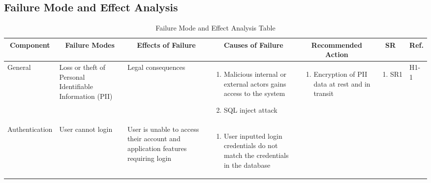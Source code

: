\documentclass{article}
\begin{document}
\newpage
\begin{landscape}
	\section{Failure Mode and Effect Analysis}
	\begin{longtable}{|p{}|p{}|p{}|p{}|p{}|p{}|p{}|}
		\caption{Failure Mode and Effect Analysis Table}                                                                \\
		\hline
		\multicolumn{1}{|c|}{\textbf{Component}}
		 & \multicolumn{1}{|c|}{\textbf{Failure Modes}}
		 & \multicolumn{1}{|c|}{\textbf{Effects of Failure}}
		 & \multicolumn{1}{|c|}{\textbf{Causes of Failure}}
		 & \multicolumn{1}{|c|}{\textbf{Recommended Action}}
		 & \multicolumn{1}{|c|}{\textbf{SR}}
		 & \multicolumn{1}{|c|}{\textbf{Ref.}}                                                                          \\
		\hline
		General
		 & Loss or theft of Personal Identifiable Information (PII)
		 & Legal consequences
		 & \begin{enumerate}[label=\alph*., leftmargin=*]
			   \item Malicious internal or external actors gains access to the system
			   \item SQL inject attack
		   \end{enumerate}
		 & \begin{enumerate}[label=\alph*., leftmargin=*]
			   \item Encryption of PII data at rest and in transit
		   \end{enumerate}
		 & \begin{enumerate}[label=\alph*., leftmargin=*]
			   \item SR1
		   \end{enumerate}
		 & H1-1                                                                                                         \\
		\hline
		\multirow{2}{*}{Authentication}
		 & User cannot login
		 & User is unable to access their account and application features requiring login
		 & \begin{enumerate}[label=\alph*., leftmargin=*]
			   \item User inputted login credentials do not match the credentials in the database
		   \end{enumerate}
		 & \begin{enumerate}[label=\alph*., leftmargin=*]

\end{enumerate}
\end{longtable}
\end{landscape}
\end{document}
